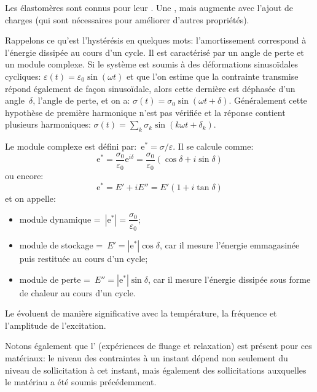 \medskip
Les élastomères sont connus pour leur . Une , mais augmente avec l'ajout de charges (qui sont nécessaires pour améliorer d'autres propriétés).

Rappelons ce qu'est l'hystérésis en quelques mots: l'amortissement correspond à l'énergie dissipée au cours d'un cycle. Il est caractérisé par un angle de perte et un module complexe. Si le système est soumis à des déformations sinusoïdales cycliques: 
$\varepsilon(t)=\varepsilon_0\sin(\omega t)$ 
et que l'on estime que la contrainte transmise répond également de façon sinusoïdale, alors cette dernière est déphasée d'un angle~$\delta$, l'angle de perte, et on a: 
$\sigma(t)=\sigma_0\sin(\omega t+\delta)$.
Généralement cette hypothèse de première harmonique n'est pas vérifiée et la réponse contient plusieurs harmoniques:
$\sigma(t) = \sum_k \sigma_k\sin(k\omega t+\delta_k)$.

Le module complexe est défini par:~$\mathrm{e}^* = \sigma / \varepsilon$. Il se calcule comme:
\begin{equation} \mathrm{e}^*=\dfrac{\sigma_0}{\varepsilon_0}\mathrm{e}^{i\delta}=\dfrac{\sigma_0}{\varepsilon_0}(\cos\delta+i\sin\delta)\end{equation}
ou encore:
\begin{equation}
\mathrm{e}^* = E' + i E'' = E'(1+i\tan\delta)
\end{equation}
et on appelle:
\begin{itemize}
	\item module dynamique =~$|\mathrm{e}^*|=\dfrac{\sigma_0}{\varepsilon_0}$;
	\item module de stockage =~$E'=|\mathrm{e}^*|\cos\delta$, car il mesure l'énergie
		emmagasinée puis restituée au cours d'un cycle;
	\item module de perte =~$E''=|\mathrm{e}^*|\sin\delta$, car il mesure l'énergie
		dissipée sous forme de chaleur au cours d'un cycle.
\end{itemize}
Le  évoluent de manière significative avec la température, la fréquence et l'amplitude
de l'excitation.

\medskip
Notons également que l' (expériences de fluage et relaxation) est présent pour ces matériaux: le niveau des contraintes à un instant dépend non seulement du niveau de sollicitation à cet instant, mais également des sollicitations auxquelles le matériau a été soumis précédemment.


